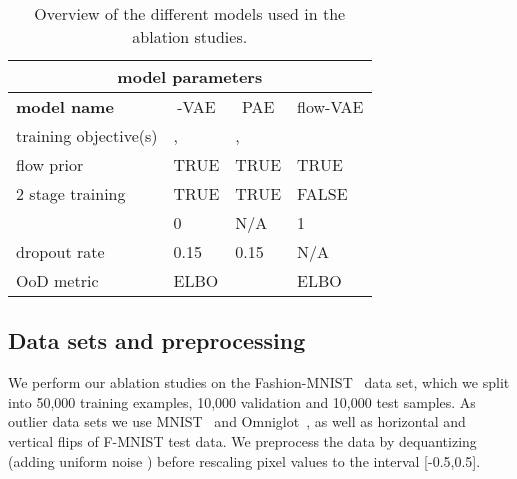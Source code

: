 \documentclass[10pt]{article} \usepackage[accepted]{tmlr}
\begin{document}
\begin{table}[h]
\begin{center}
\begin{tabular}{llll}
\multicolumn{4}{c}{\textbf{model parameters}}                                                                                                                                                    \\ \hline
\multicolumn{1}{l|}{\textbf{model name}}   & \multicolumn{1}{c|}{-VAE } & \multicolumn{1}{c|}{PAE}         & \multicolumn{1}{l}{flow-VAE}\\ \hline
\multicolumn{1}{l|}{training objective(s)} & \multicolumn{1}{l|}{, }       & \multicolumn{1}{l|}{,}    & \multicolumn{1}{l}{}          \\ 
\multicolumn{1}{l|}{flow prior}            & \multicolumn{1}{l|}{TRUE}                 & \multicolumn{1}{l|}{TRUE}                     & \multicolumn{1}{l}{TRUE }              \\ 
\multicolumn{1}{l|}{2 stage training}      & \multicolumn{1}{l|}{TRUE}                & \multicolumn{1}{l|}{TRUE}                      & \multicolumn{1}{l}{FALSE}                  \\
\multicolumn{1}{l|}{}               & \multicolumn{1}{l|}{0}                    & \multicolumn{1}{l|}{N/A}                      & \multicolumn{1}{l}{1}                     \\
\multicolumn{1}{l|}{dropout rate}          & \multicolumn{1}{l|}{0.15}                 & \multicolumn{1}{l|}{0.15}                     & \multicolumn{1}{l}{N/A}                       \\
\multicolumn{1}{l|}{OoD metric}            & \multicolumn{1}{l|}{ELBO}                 & \multicolumn{1}{l|}{}                 & \multicolumn{1}{l}{ELBO}                     \\
\end{tabular}
\end{center}
\caption{\label{tab:models}Overview of the different models used in the ablation studies.}
\end{table}
\subsection{Data sets and preprocessing}
We perform our ablation studies on the Fashion-MNIST~\citep{f-mnist} data set, which we split into 50,000 training examples, 10,000 validation and 10,000 test samples. As outlier data sets we use MNIST~\citep{LecunMNIST} and Omniglot~\citep{OMNIGLOT}, as well as horizontal and vertical flips of F-MNIST test data. We preprocess the data by dequantizing (adding uniform noise ) before rescaling pixel values to the interval [-0.5,0.5].
\end{document}
